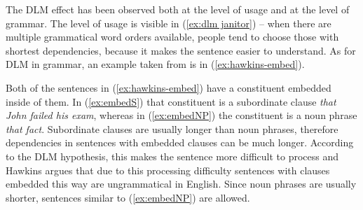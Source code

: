 The DLM effect has been observed both at the level of usage and at the level of grammar. The level of usage is visible in (\ref{ex:dlm janitor}) -- when there are multiple grammatical word orders available, people tend to choose those with shortest dependencies, because it makes the sentence easier to understand. As for DLM in grammar, an example taken from \cite[p.~20]{Hawkins-1994} is in (\ref{ex:hawkins-embed}). 
\begin{exe}
\ex\label{ex:hawkins-embed}
\begin{xlist}
	\label{ex:embedS}
	\label{ex:embedNP}
\end{xlist}
\end{exe}
Both of the sentences in (\ref{ex:hawkins-embed}) have a constituent embedded inside of them. In (\ref{ex:embedS}) that constituent is a subordinate clause \textsl{that John failed his exam}, whereas in (\ref{ex:embedNP}) the constituent is a noun phrase \textsl{that fact}. Subordinate clauses are usually longer than noun phrases, therefore dependencies in sentences with embedded clauses can be much longer. According to the DLM hypothesis, this makes the sentence more difficult to process and Hawkins argues that due to this processing difficulty sentences with clauses embedded this way are ungrammatical in English. Since noun phrases are usually shorter, sentences similar to (\ref{ex:embedNP}) are allowed. 





